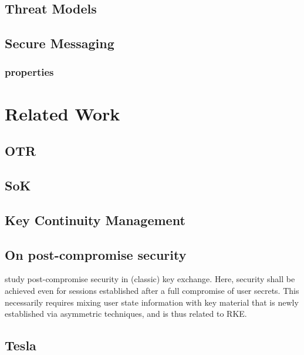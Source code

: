 \subsection{Threat Models}

\subsection{Secure Messaging}
	
	\subsubsection{properties}
	
	
\section{Related Work}
	\subsection{OTR}
	\subsection{SoK}
	\subsection{Key Continuity Management}
	\subsection{On post-compromise security}
	study post-compromise security 	in (classic) key exchange. Here, security shall be achieved even for sessions established after a full compromise of user secrets. This necessarily requires mixing user state information with key material that is newly established via asymmetric techniques, and is thus related to RKE.
	\subsection{Tesla}